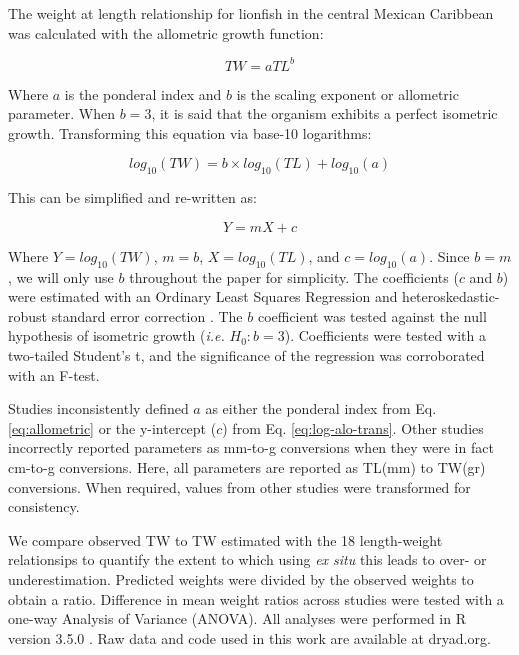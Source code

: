 \documentclass[fleqn,10pt,lineno]{wlpeerj} %
\begin{document}
The weight at length relationship for lionfish in the central Mexican
Caribbean was calculated with the allometric growth function:

\begin{equation}
\label{eq:allometric}
TW = aTL^b
\end{equation}

Where \(a\) is the ponderal index and \(b\) is the scaling exponent or
allometric parameter. When \(b = 3\), it is said that the organism
exhibits a perfect isometric growth. Transforming this equation via
base-10 logarithms:

\begin{equation}
\label{eq:log-alo}
log_{10}(TW) = b\times log_{10}(TL) + log_{10}(a)
\end{equation}

This can be simplified and re-written as:

\begin{equation}
\label{eq:log-alo-trans}
Y = mX + c
\end{equation}

Where \(Y = log_{10}(TW)\), \(m = b\), \(X = log_{10}(TL)\), and
\(c = log_{10}(a)\). Since \(b = m\), we will only use \(b\) throughout
the paper for simplicity. The coefficients (\(c\) and \(b\)) were
estimated with an Ordinary Least Squares Regression and
heteroskedastic-robust standard error correction \citep{zeileis_2004}.
The \(b\) coefficient was tested against the null hypothesis of
isometric growth (\emph{i.e.} \(H_0: b = 3\)). Coefficients were tested
with a two-tailed Student's t, and the significance of the regression
was corroborated with an F-test.

Studies inconsistently defined \(a\) as either the ponderal index from
Eq. \ref{eq:allometric} or the y-intercept (\(c\)) from Eq.
\ref{eq:log-alo-trans}. Other studies incorrectly reported parameters as
mm-to-g conversions when they were in fact cm-to-g conversions. Here,
all parameters are reported as TL(mm) to TW(gr) conversions. When
required, values from other studies were transformed for consistency.

We compare observed TW to TW estimated with the 18 length-weight
relationsips to quantify the extent to which using \emph{ex situ} this
leads to over- or underestimation. Predicted weights were divided by the
observed weights to obtain a ratio. Difference in mean weight ratios
across studies were tested with a one-way Analysis of Variance (ANOVA).
All analyses were performed in R version 3.5.0 \citep{rcore_2018}. Raw
data and code used in this work are available at dryad.org.
\end{document}
